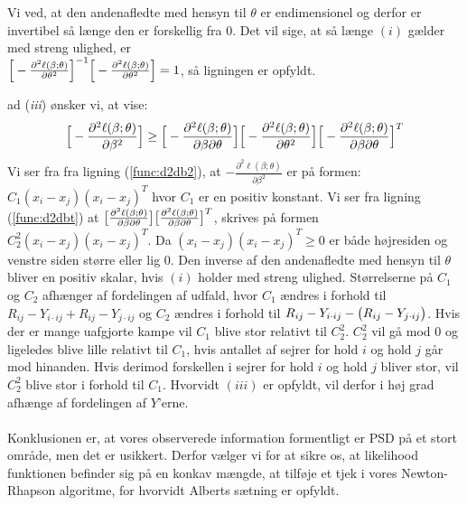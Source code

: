 \documentclass[11pt,a4paper]{article}
\begin{document}
Vi ved, at den andenafledte med hensyn til $\theta$ er endimensionel og derfor er invertibel så længe den er forskellig fra 0. Det vil sige, at så længe $(i)$ gælder med streng ulighed, er
\\ $\Big{[}-\frac{\partial^2 \ell(\beta;\theta)}{\partial \theta^2}\Big{]}^{-1}\Big{[}-\frac{\partial^2 \ell(\beta;\theta)}{\partial \theta^2}\Big{]}=1$, så ligningen er opfyldt.\newline \par
ad (\textit{iii}) ønsker vi, at vise:
\begin{align*}
  \Big{[}-\frac{\partial^2 \ell(\beta;\theta)}{\partial \beta^2}\Big{]} \geq \Big{[}-\frac{\partial^2 \ell(\beta;\theta)}{\partial \beta \partial \theta}\Big{]}\Big{[}-\frac{\partial^2 \ell(\beta;\theta)}{\partial \theta^2}\Big{]}\Big{[}-\frac{\partial^2 \ell(\beta;\theta)}{\partial \beta \partial \theta}\Big{]}^T
\end{align*}
Vi ser fra fra ligning (\ref{func:d2db2}), at $-\frac{\partial^2 \ell(\beta;\theta)}{\partial \beta^2}$ er på formen: $C_1(x_i-x_j)(x_i-x_j)^T$ hvor $C_1$ er en positiv konstant. Vi ser fra ligning (\ref{func:d2dbt}) at $\big{[}\frac{\partial^2 \ell(\beta;\theta)}{\partial \beta \partial \theta}\big{]}\big{[}\frac{\partial^2 \ell(\beta;\theta)}{\partial \beta \partial \theta}\big{]}^T$, skrives på formen $C_2^2(x_i-x_j)(x_i-x_j)^T$. Da $(x_i-x_j)(x_i-x_j)^T\geq0$ er både højresiden og venstre siden større eller lig 0. Den inverse af den andenafledte med hensyn til $\theta$ bliver en positiv skalar, hvis $(i)$ holder med streng ulighed. Størrelserne på $C_1$ og $C_2$ afhænger af fordelingen af udfald, hvor $C_1$ ændres i forhold til $R_{ij}-Y_{i\cdot ij} + R_{ij}-Y_{j\cdot ij}$ og $C_2$ ændres i forhold til $R_{ij}-Y_{i\cdot ij} - \big{(}R_{ij}-Y_{j\cdot ij}\big{)}$. Hvis der er mange uafgjorte kampe vil $C_1$ blive stor relativt til $C_2^2$. $C_2^2$ vil gå mod 0 og ligeledes blive lille relativt til $C_1$, hvis antallet af sejrer for hold $i$ og hold $j$ går mod hinanden. Hvis derimod forskellen i sejrer for hold $i$ og hold $j$ bliver stor, vil $C_2^2$ blive stor i forhold til $C_1$. Hvorvidt $(iii)$ er opfyldt, vil derfor i høj grad afhænge af fordelingen af $Y$'erne. \\\\
Konklusionen er, at vores observerede information formentligt er PSD på et stort område, men det er usikkert. Derfor vælger vi for at sikre os, at likelihood funktionen befinder sig på en konkav mængde, at tilføje et tjek i vores Newton-Rhapson algoritme, for hvorvidt Alberts sætning er opfyldt. \\
\end{document}
